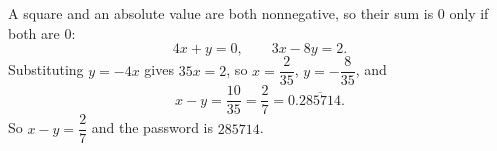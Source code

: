 A square and an absolute value are both nonnegative, so their sum is $0$ only if both are $0$:
\[4x+y=0,\qquad3x-8y=2.\]
Substituting $y=-4x$ gives $35x=2$, so $x=\dfrac2{35}$, $y=-\dfrac8{35}$, and
\[x-y=\dfrac{10}{35}=\dfrac27=0.\overline{285714}.\]
So $x-y=\dfrac27$ and the password is $\boxed{285714}$.
